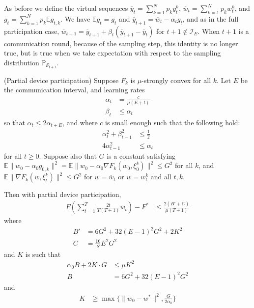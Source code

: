 As before we define the virtual sequences $\overline{y}_{t}=\sum_{k=1}^{N}p_{k}y_{t}^{k}$,
$\overline{w}_{t}=\sum_{k=1}^{N}p_{k}w_{t}^{k}$, and $\overline{g}_{t}=\sum_{k=1}^{N}p_{k}\mathbb{E}g_{t,k}$.
We have $\mathbb{E}g_{t}=\overline{g}_{t}$ and $\overline{y}_{t+1}=\overline{w}_{t}-\alpha_{t}g_{t}$,
and as in the full participation case, $\overline{w}_{t+1}=\overline{y}_{t+1}+\beta_{t}(\overline{y}_{t+1}-\overline{y}_{t})$
for $t+1\notin\mathcal{I}_{E}$. When $t+1$ is a communication round,
because of the sampling step, this identity is no longer true, but
is true when we take expectation with respect to the sampling distribution
$\mathbb{P}_{\mathcal{S}_{t+1}}$. 
\begin{theorem}
	(Partial device participation) Suppose $F_{k}$ is $\mu$-strongly
	convex for all $k$. Let $E$ be the communication interval, and learning
	rates 
	\begin{align*}
	\alpha_{t} & =\frac{c}{\mu(E+t)}\\
	\beta_{t} & \leq\alpha_{t}
	\end{align*}
	so that $\alpha_{t}\leq2\alpha_{t+E}$, and where $c$ is small enough
	such that the following hold: 
	\begin{align*}
	\alpha_{t}^{2}+\beta_{t-1}^{2} & \leq\frac{1}{2}\\
	4\alpha_{t-1}^{2} & \leq\alpha_{t}
	\end{align*}
	for all $t\geq0$. Suppose also that $G$ is a constant satisfying
	$\mathbb{E}\|w_{0}-\alpha_{0}g_{0,k}\|^{2}=\mathbb{E}\|w_{0}-\alpha_{0}\nabla F_{k}(w_{0},\xi_{0}^{k})\|^{2}\leq G^{2}$
	for all $k$, and $\mathbb{E}\|\nabla F_{k}(w,\xi_{t}^{k})\|^{2}\leq G^{2}$
	for $w=\overline{w}_{t}$ or $w=w_{t}^{k}$ and all $t,k$.
	
	Then with partial device participation, \textbf{
		\begin{align*}
		F(\sum_{t=1}^{T}\frac{2t}{T(T+1)}\overline{w}_{t})-F^{\ast} & \leq\frac{2(B'+C)}{\mu(T+1)}
		\end{align*}
	} where
	\begin{align*}
	B' & =6G^{2}+32(E-1)^{2}G^{2}+2K^{2}\\
	C & =\frac{16}{S}E^{2}G^{2}
	\end{align*}
	and $K$ is such that 
	\begin{align*}
	\alpha_{0}B+2K\cdot G & \leq\mu K^{2}\\
	B & =6G^{2}+32(E-1)^{2}G^{2}
	\end{align*}
	and
	\begin{align*}
	K & \geq\max\{\|w_{0}-w^{\ast}\|^{2},\frac{G}{2\alpha_{0}}\}
	\end{align*}
\end{theorem}
